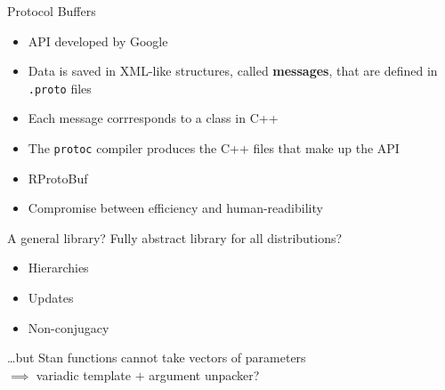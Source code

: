 \begin{frame}{Protocol Buffers}
	\begin{itemize}
		\item API developed by Google
		\item Data is saved in XML-like structures, called \textbf{messages}, that are defined in \texttt{.proto} files
		\item Each message corrresponds to a class in C++
		\item The \texttt{protoc} compiler produces the C++ files that make up the API
		\item RProtoBuf
		\item Compromise between efficiency and human-readibility
	\end{itemize}
\end{frame}

\begin{frame}{A general library?}
	Fully abstract library for all distributions?
	\begin{itemize}
		\item Hierarchies
		\item Updates
		\item Non-conjugacy
	\end{itemize}
	\vspace{10pt}
	\dots but Stan functions cannot take vectors of parameters \\
	$\implies$ variadic template $+$ argument unpacker?
\end{frame}


